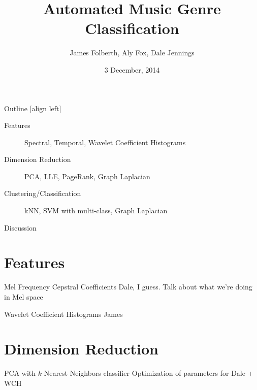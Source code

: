\documentclass[xcolor=dvipsnames,t]{beamer} %
\title{Automated Music Genre Classification}
\date{3 December, 2014}
\author{James Folberth, Aly Fox, Dale Jennings}
\begin{document}
\begin{frame}
\maketitle
\end{frame}


\begin{frame}{Outline}
   [align left] %
   \begin{description}                              %
      \item[Features] Spectral, Temporal, Wavelet Coefficient Histograms\\
      \item[Dimension Reduction] PCA, LLE, PageRank, Graph Laplacian\\
      \item[Clustering/Classification] kNN, SVM with multi-class, Graph Laplacian\\
      \item[Discussion]
   \end{description}

\end{frame}



\section{Features}
\begin{frame}{Mel Frequency Cepstral Coefficients}
   Dale, I guess.  Talk about what we're doing in Mel space

\end{frame}

\begin{frame}{Wavelet Coefficient Histograms}
James
\end{frame}



\section{Dimension Reduction}
\begin{frame}{PCA with $k$-Nearest Neighbors classifier} %
Optimization of parameters for Dale + WCH
\end{frame}
\end{document}
